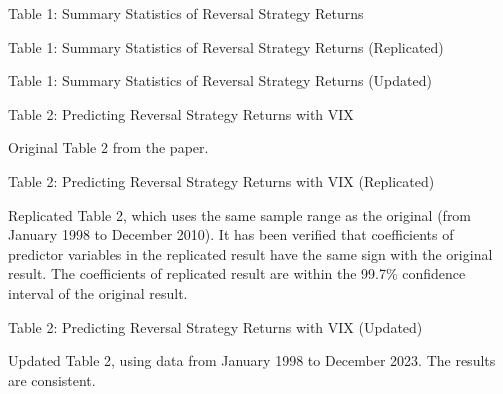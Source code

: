 \documentclass{article}
\newcommand*{\PathToOutput}{../output/}
\begin{document}
\begin{table}
    \centering
    \caption*{Table 1:  Summary Statistics of Reversal Strategy Returns}

    
\end{table}


\begin{table}
    \centering
    \caption*{Table 1:  Summary Statistics of Reversal Strategy Returns (Replicated)}

    
\end{table}


\begin{table}
    \centering
    \caption*{Table 1:  Summary Statistics of Reversal Strategy Returns (Updated)}

    
\end{table}


\begin{landscape}
\begin{table}
    \centering
    \caption*{Table 2: Predicting Reversal Strategy Returns with VIX}
    
    \small Original Table 2 from the paper.
    \medskip

    
\end{table}


\begin{table}
    \centering
    \caption*{Table 2: Predicting Reversal Strategy Returns with VIX (Replicated)}

    \raggedright
    \small Replicated Table 2, which uses the same sample range as the original (from 
    January 1998 to December 2010). 
    It has been verified that coefficients of predictor variables in the replicated result
    have the same sign with the original result. The coefficients of replicated result are
    within the 99.7\% confidence interval of the original result.
    \medskip

    \centering
    
\end{table}

\begin{table}
    \centering
    \caption*{Table 2: Predicting Reversal Strategy Returns with VIX (Updated)}

    \small Updated Table 2, using data from January 1998 to December 2023.
    The results are consistent.
    \medskip

    
\end{table}

\end{landscape}

\newpage


\end{document}
